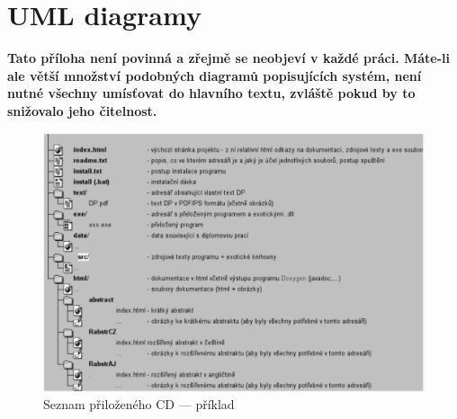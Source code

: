 \documentclass[11pt,twoside,a4paper]{book}
\begin{document}
\chapter{UML diagramy}
\textbf{\large Tato příloha není povinná a zřejmě se neobjeví v každé práci. Máte-li ale větší množství podobných diagramů popisujících systém, není nutné všechny umísťovat do hlavního textu, zvláště pokud by to snižovalo jeho čitelnost.}

\begin{figure}[h]
\begin{center}
\includegraphics[width=14cm]{figures/seznamcd}
\caption{Seznam přiloženého CD --- příklad}
\label{fig:seznamcd}
\end{center}
\end{figure}
\end{document}
